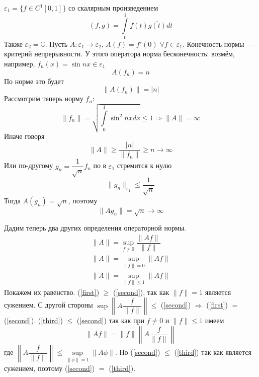 \documentclass[14pt]{extarticle}
\begin{document}
\begin{Prim}
	$\varepsilon_1 = \{f \in C^1[0,1]\}$ со скалярным произведением
	$$
	(f, g) = \int\limits_0^1 f(t) \overline{g(t)} dt
	$$
	Также $\varepsilon_2 = \mathbb C$.
	Пусть $A : \varepsilon_1 \to \varepsilon_2$, $A(f)=f'(0)\; \forall f \in \varepsilon_1$.
	Конечность нормы~--- критерий непрерывности.
	У этого оператора норма бесконечность: возмём, например, $f_n(x) = \sin{nx} 	\in \varepsilon_1$
	$$
	A(f_n) = n
	$$
	По норме это будет
	$$
	\|A(f_n)\| = |n|
	$$
	Рассмотрим теперь норму $f_n$:
	$$
	\|f_n\| = \sqrt{ \int \limits_0^1 \sin^2{nx} dx} \le 1 \Rightarrow \|A\| = \infty
	$$
	Иначе говоря
	$$
	\|A\| \ge \dfrac{|n|}{\|f_n\|} \ge n \to \infty
	$$
	Или по-другому $g_n = \dfrac{1}{\sqrt{n}} f_n$ по в $\varepsilon_1$ стремится к 	нулю
	$$
	\|g_n\|_{\varepsilon_1} \le \dfrac{1}{\sqrt{n}}
	$$
	Тогда $A(g_n) = \sqrt{n}$, поэтому
	$$
	\|Ag_n\| = \sqrt{n} \to \infty
	$$
\end{Prim}

Дадим теперь два других определения операторной нормы.
\begin{gather}
	\label{first}
	\|A\| = \sup\limits_{f \ne 0}{\dfrac{\|Af\|}{\|f\|}}\\
	\label{second}
	\|A\| = \sup\limits_{\|f\| = 0} \|Af\|\\
	\label{third}
	\|A\| = \sup\limits_{\|f\| \le 1}\|Af\|
\end{gather}
Покажем их равенство.
(\ref{first}) $\ge$ (\ref{second}), так как $\|f\| = 1$ является сужением.
С другой стороны $\sup\left\|A\dfrac{f}{\|f\|}\right\| \le $ (\ref{second}) $\Rightarrow$  (\ref{first}) $=$ (\ref{second}).
(\ref{third}) $\le$ (\ref{second}) так как при $f \ne 0$ и $\|f\| \le 1$ имеем 
$$
\|Af\| =\|f\| \left\|A\dfrac{f}{\|f\|}\right\|
$$
где $\left\|A\dfrac{f}{\|f\|}\right\| \le \sup\limits_{\|\phi\| = 1} \|A\phi\|$.
Но (\ref{second}) $\le$ (\ref{third}) так как является сужением, поэтому (\ref{second}) $=$ (\ref{third}).
\end{document}
